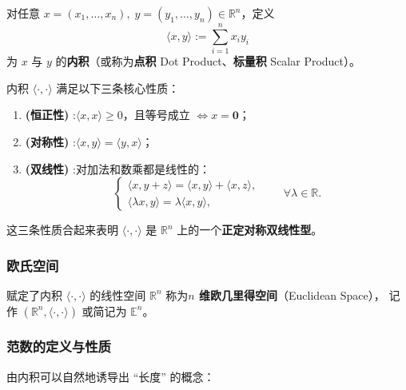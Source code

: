 \documentclass[lang=cn,11pt]{elegantbook}
\begin{document}
\begin{definition} \label{def:inner-product}
对任意 $x=(x_1,\dots,x_n),\;y=(y_1,\dots,y_n)\in\mathbb R^n$，定义
\[
\boxed{\;\langle x,y\rangle:=\sum_{i=1}^{n}x_i y_i\;}
\]
为 $x$ 与 $y$ 的\textbf{内积}（或称为\textbf{点积} Dot Product、\textbf{标量积} Scalar Product）。
\end{definition}

\begin{property}[内积的基本性质] \label{prop:inner-product-properties}
内积 $\langle\cdot,\cdot\rangle$ 满足以下三条核心性质：
\begin{enumerate}
  \item\textbf{(恒正性)} :$\langle x,x\rangle\geq 0$，且等号成立 $\Longleftrightarrow x=\boldsymbol 0$；
  \item\textbf{(对称性)} :$\langle x,y\rangle=\langle y,x\rangle$；
  \item\textbf{(双线性)} :对加法和数乘都是线性的：
        \[
        \begin{cases}
          \langle x,y+z\rangle=\langle x,y\rangle+\langle x,z\rangle,\\
          \langle\lambda x,y\rangle=\lambda\langle x,y\rangle,
        \end{cases}
        \qquad\forall\lambda\in\mathbb R.
        \]
\end{enumerate}
\end{property}

这三条性质合起来表明 $\langle\cdot,\cdot\rangle$ 是 $\mathbb R^n$ 上的一个\textbf{正定对称双线性型}。

\subsubsection{欧氏空间}

\begin{definition} \label{def:euclidean-space}
赋定了内积 $\langle\cdot,\cdot\rangle$ 的线性空间 $\mathbb R^n$ 称为\textbf{$n$ 维欧几里得空间}（Euclidean Space），
记作 $(\mathbb R^n,\langle\cdot,\cdot\rangle)$ 或简记为 $\mathbb E^n$。
\end{definition}

\subsubsection{范数的定义与性质}

由内积可以自然地诱导出 ``长度'' 的概念：
\end{document}
